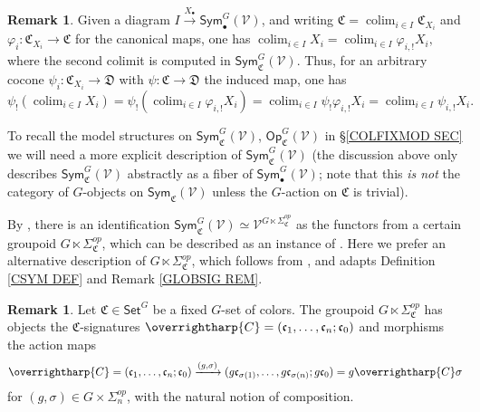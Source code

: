 \documentclass[a4paper,10pt
,draft
]{article}%
\numberwithin{equation}{section}
\numberwithin{figure}{section}
\theoremstyle{definition} %
\newtheorem{remark}[equation]{Remark}%
\newcommand{\vect}[1]{\text{\overrightharp{\ensuremath{#1}}}}
\DeclareMathOperator{\colim}{colim}%
\newcommand{\V}{\ensuremath{\mathcal V}}
\newcommand{\1}{\ensuremath{\mathbbm 1}}%
\begin{document}
\begin{remark}
	Given a diagram
	$I \xrightarrow{X_{\bullet}} 
	\mathsf{Sym}_{\bullet}^G(\V)$,
	and writing
	$\mathfrak{C} = \colim_{i \in I} \mathfrak{C}_{X_i}$
	and 
	$\varphi_i \colon \mathfrak{C}_{X_i} \to \mathfrak{C}$
	for the canonical maps,
	one has
	$	
	\colim_{i \in I} X_i = 
	\colim_{i \in I} \varphi_{i,!} X_i,
	$	
	where the second colimit is computed in 
	$\mathsf{Sym}_{\mathfrak{C}}^G(\V)$.
	Thus, for an arbitrary cocone
	$\psi_i \colon \mathfrak{C}_{X_i} \to \mathfrak{D}$
	with  
	$\psi \colon \mathfrak{C} \to \mathfrak{D}$ the induced map, one has
	\begin{equation}\label{LIMINFIBSUP EQ}
	\psi_!\left(\colim_{i \in I} X_i\right) 
	= 
	\psi_!
	\left(\colim_{i \in I} \varphi_{i,!} X_i\right)
	=
	\colim_{i \in I} \psi_! \varphi_{i,!} X_i
	=
	\colim_{i \in I} \psi_{i,!} X_i.
	\end{equation}
\end{remark}


To recall the model structures on 
$\mathsf{Sym}^G_{\mathfrak{C}}(\V)$,
$\mathsf{Op}^G_{\mathfrak{C}}(\V)$
in \S \ref{COLFIXMOD SEC}
we will need a more explicit description of 
$\mathsf{Sym}^G_{\mathfrak{C}}(\V)$
(the discussion above
only describes $\mathsf{Sym}^G_{\mathfrak{C}}(\V)$
abstractly as a fiber of $\mathsf{Sym}^G_{\bullet}(\V)$;
note that this 
\emph{is not} the category 
of $G$-objects on $\mathsf{Sym}_{\mathfrak{C}}(\V)$
unless the $G$-action on $\mathfrak{C}$
is trivial).


By \cite[Prop. \ref{OC-EQUIVFNCON PROP}]{BP_FCOP},
there is an identification 
$\mathsf{Sym}^G_{\mathfrak{C}}(\mathcal{V}) 
\simeq 
\V^{G \ltimes \Sigma^{op}_{\mathfrak{C}}}$
as the functors from a certain groupoid
$G \ltimes \Sigma^{op}_{\mathfrak{C}}$,
which can be described as an instance of
\cite[Ex. \ref{OC-GLTIMES EQ}]{BP_FCOP}.
Here we prefer an alternative description
of $G \ltimes \Sigma^{op}_{\mathfrak{C}}$,
which follows from 
\cite[Rem. \ref{OC-SIGACT REM}]{BP_FCOP},
and adapts Definition \ref{CSYM DEF} and
Remark \ref{GLOBSIG REM}.



\begin{remark}\label{GLTIMESSIG REM}
	Let $\mathfrak {C} \in \mathsf{Set}^G$ be a fixed $G$-set of colors.
	The groupoid $G \ltimes \Sigma^{op}_{\mathfrak{C}}$
	has objects the $\mathfrak {C}$-signatures
	$\vect C = (\mathfrak c_1, \dots, \mathfrak c_n; \mathfrak c_0)$
	and morphisms the action maps
	\begin{equation}\label{CSYMG EQ}
	\vect{C} =
	(\mathfrak c_1, \dots, \mathfrak c_n; \mathfrak c_0) \xrightarrow{(g,\sigma)} 
	(g \mathfrak c_{\sigma(1)}, \dots, 
	g \mathfrak c_{\sigma(n)}; 
	g \mathfrak c_0)
	= g \vect{C} \sigma
	\end{equation}
	for $(g,\sigma) \in G \times \Sigma_n^{op}$,
	with the natural notion of composition.
\end{remark}
\end{document}
